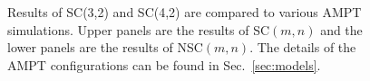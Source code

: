 \documentclass[ALICE,manyauthors]{cernphprep}
\begin{document}
\begin{figure}[p]
\begin{center}
        \caption{Results of  SC(3,2) and SC(4,2) are compared to various AMPT simulations. Upper panels are the results of SC$(m,n)$ and the lower panels are the results of NSC$(m,n)$. The details of the AMPT configurations can be found in Sec.~\ref{sec:models}.}
        \label{fig:Figure_5}
        \end{center}   
 \end{figure}
 
 \newpage
\end{document}
